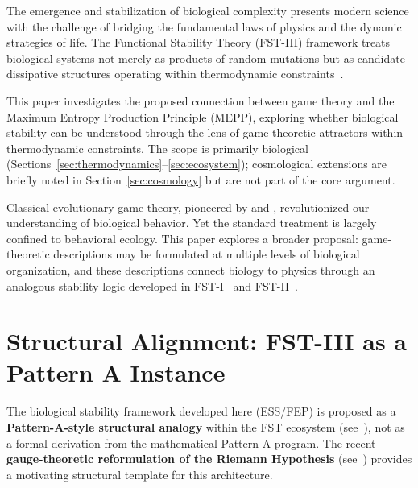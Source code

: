 \documentclass[12pt,a4paper]{article}
\theoremstyle{remark}
\begin{document}
The emergence and stabilization of biological complexity presents modern science with the challenge of bridging the fundamental laws of physics and the dynamic strategies of life. The Functional Stability Theory (FST-III) framework treats biological systems not merely as products of random mutations but as candidate dissipative structures operating within thermodynamic constraints~\citep{EcosystemMEPP}.

This paper investigates the proposed connection between game theory and the Maximum Entropy Production Principle (MEPP), exploring whether biological stability can be understood through the lens of game-theoretic attractors within thermodynamic constraints. The scope is primarily biological (Sections~\ref{sec:thermodynamics}--\ref{sec:ecosystem}); cosmological extensions are briefly noted in Section~\ref{sec:cosmology} but are not part of the core argument.

Classical evolutionary game theory, pioneered by \citet{MaynardSmithPrice1973} and \citet{MaynardSmith1982}, revolutionized our understanding of biological behavior. Yet the standard treatment is largely confined to behavioral ecology. This paper explores a broader proposal: game-theoretic descriptions may be formulated at multiple levels of biological organization, and these descriptions connect biology to physics through an analogous stability logic developed in FST-I~\citep{FSTI} and FST-II~\citep{FSTII}.

\section{Structural Alignment: FST-III as a Pattern A Instance}
\label{sec:structural-alignment}

The biological stability framework developed here (ESS/FEP) is proposed as a \textbf{Pattern-A-style structural analogy} within the FST ecosystem (see~\citealp{FST-Unified2026}), not as a formal derivation from the mathematical Pattern A program. The recent \textbf{gauge-theoretic reformulation of the Riemann Hypothesis} (see~\citealp{GeigerRH2026c}) provides a motivating structural template for this architecture.
\end{document}
